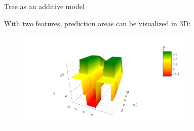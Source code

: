 \documentclass[11pt,compress,t,notes=noshow, xcolor=table]{beamer}
\begin{document}
\begin{vbframe}{Tree as an additive model}

With two features, prediction areas can be visualized in 3D:

\begin{figure} 
\includegraphics[width=0.75\textwidth, keepaspectratio]{figure_man/tree-contin-surface3d.png}
\end{figure}

\end{vbframe}










\endlecture
\end{document}
